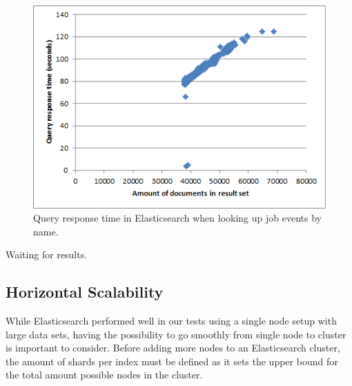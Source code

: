 \begin{figure}[h!]
\centering
\includegraphics[]{figure/query_by_name.png}
\caption{Query response time in Elasticsearch when looking up job events by name.}
\label{fig:query_by_name}
\end{figure}

Waiting for results.
%

\subsection{Horizontal Scalability}
While Elasticsearch performed well in our tests using a single node setup with large data sets, having the possibility to go smoothly from single node to cluster is important to consider. Before adding more nodes to an Elasticsearch cluster, the amount of shards per index must be defined as it sets the upper bound for the total amount possible nodes in the cluster.

